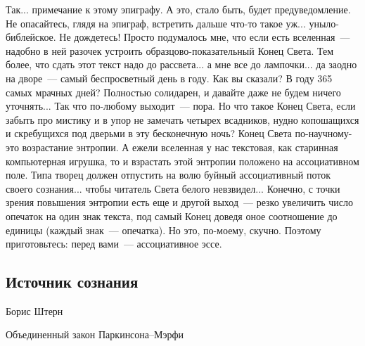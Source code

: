 \documentclass{scrbook}
\newcommand{\mdash}{~--- }
\newcommand{\ndash}{--}
\newcommand{\essaysection}[1]{\subsection*{#1}\nopagebreak}
\begin{document}
Так... примечание к этому эпиграфу. А это, стало быть, будет предуведомление. Не опасайтесь, глядя на эпиграф, встретить дальше что-то такое уж... уныло-библейское. Не дождетесь! Просто подумалось мне, что если есть вселенная{\mdash}надобно в ней разочек устроить образцово-показательный Конец Света. Тем более, что сдать этот текст надо до рассвета... а мне все до лампочки... да заодно на дворе{\mdash}самый беспросветный день в году. Как вы сказали? В году 365 самых мрачных дней? Полностью солидарен, и давайте даже не будем ничего уточнять... Так что по-любому выходит{\mdash}пора. Но что такое Конец Света, если забыть про мистику и в упор не замечать четырех всадников, нудно копошащихся и скребущихся под дверьми в эту бесконечную ночь? Конец Света по-научному-это возрастание энтропии. А ежели вселенная у нас текстовая, как старинная компьютерная игрушка, то и взрастать этой энтропии положено на ассоциативном поле. Типа творец должен отпустить на волю буйный ассоциативный поток своего сознания... чтобы читатель Света белого невзвидел... Конечно, с точки зрения повышения энтропии есть еще и другой выход{\mdash}резко увеличить число опечаток на один знак текста, под самый Конец доведя оное соотношение до единицы (каждый знак{\mdash}опечатка). Но это, по-моему, скучно. Поэтому приготовьтесь: перед вами{\mdash}ассоциативное эссе.

\essaysection{Источник сознания}

\begin{epigraphs}
{Борис Штерн}

{Объединенный закон Паркинсона{\ndash}Мэрфи}
\end{epigraphs}
\end{document}
